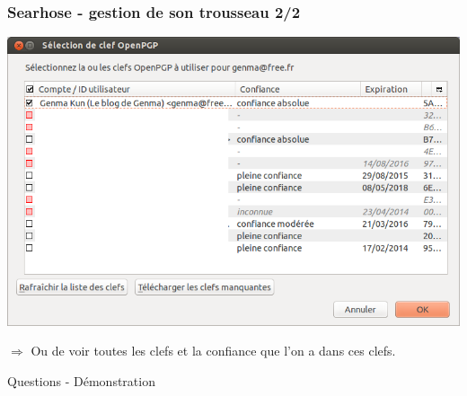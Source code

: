 \documentclass{beamer}
\begin{document}
\begin{frame}
\frametitle{Searhose - gestion de son trousseau 2/2}
\begin{center}
\includegraphics[scale=0.3] {./images/Searhose_liste_clefs.png}
\end{center}
$\Rightarrow$  Ou de voir toutes les clefs et la confiance que l'on a dans ces clefs.
\end{frame}

\begin{frame}
\begin{center}
\Huge{Questions - Démonstration }
\end{center}
\end{frame}
\end{document}
